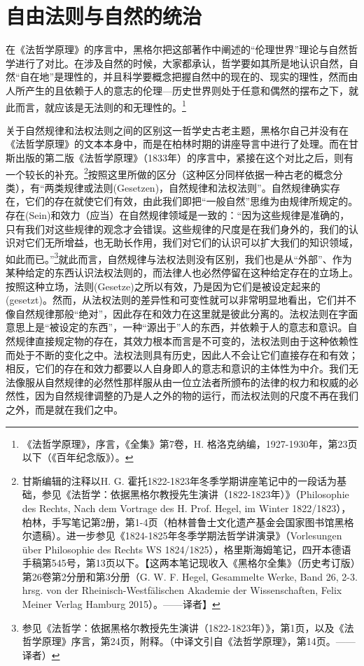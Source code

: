 \chapter{自由法则与自然的统治}

在《法哲学原理》的序言中，黑格尔把这部著作中阐述的“伦理世界”理论与自然哲学进行了对比。在涉及自然的时候，大家都承认，哲学要如其所是地认识自然，自然“自在地”是理性的，并且科学要概念把握自然中的现在的、现实的理性，然而由人所产生的且依赖于人的意志的伦理—历史世界则处于任意和偶然的摆布之下，就此而言，就应该是无法则的和无理性的。\footnote{《法哲学原理》，序言，《全集》第7卷，H. 格洛克纳编，1927-1930年，第23页以下（《百年纪念版》）。}

关于自然规律和法权法则之间的区别这一哲学史古老主题，黑格尔自己并没有在《法哲学原理》的文本本身中，而是在柏林时期的讲座导言中进行了处理。而在甘斯出版的第二版《法哲学原理》（1833年）的序言中，紧接在这个对比之后，则有一个较长的补充。\footnote{甘斯编辑的注释以H. G. 霍托1822-1823年冬季学期讲座笔记中的一段话为基础，参见《法哲学：依据黑格尔教授先生演讲（1822-1823年）》（Philosophie des Rechts, Nach dem Vortrage des H. Prof. Hegel, im Winter 1822/1823），柏林，手写笔记第2册，第1-4页（柏林普鲁士文化遗产基金会国家图书馆黑格尔遗稿）。进一步参见《1824-1825年冬季学期法哲学讲演录》（Vorlesungen über Philosophie des Rechts WS 1824/1825），格里斯海姆笔记，四开本德语手稿第545号，第13页以下。【这两本笔记现收入《黑格尔全集》（历史考订版）第26卷第2分册和第3分册（G. W. F. Hegel, Gesammelte Werke, Band 26, 2-3. hrsg. von der Rheinisch-Westfälischen Akademie der Wissenschaften, Felix Meiner Verlag Hamburg 2015）。——译者】}按照这里所做的区分（这种区分同样依据一种古老的概念分类），有“两类规律或法则(Gesetzen)，自然规律和法权法则”。自然规律确实存在，它们的存在就使它们有效，由此我们即把“一般自然”思维为由规律所规定的。存在(Sein)和效力（应当）在自然规律领域是一致的：“因为这些规律是准确的，只有我们对这些规律的观念才会错误。这些规律的尺度是在我们身外的，我们的认识对它们无所增益，也无助长作用，我们对它们的认识可以扩大我们的知识领域，如此而已。”\footnote{参见《法哲学：依据黑格尔教授先生演讲（1822-1823年）》，第1页，以及《法哲学原理》序言，第24页，附释。（中译文引自《法哲学原理》，第14页。——译者）}就此而言，自然规律与法权法则没有区别，我们也是从“外部”、作为某种给定的东西认识法权法则的，而法律人也必然停留在这种给定存在的立场上。按照这种立场，法则(Gesetze)之所以有效，乃是因为它们是被设定起来的(gesetzt)。然而，从法权法则的差异性和可变性就可以非常明显地看出，它们并不像自然规律那般“绝对”，因此存在和效力在这里就是彼此分离的。法权法则在字面意思上是“被设定的东西”，一种“源出于”人的东西，并依赖于人的意志和意识。自然规律直接规定物的存在，其效力根本而言是不可变的，法权法则由于这种依赖性而处于不断的变化之中。法权法则具有历史，因此人不会让它们直接存在和有效；相反，它们的存在和效力都要以人自身即人的意志和意识的主体性为中介。我们无法像服从自然规律的必然性那样服从由一位立法者所颁布的法律的权力和权威的必然性，因为自然规律调整的乃是人之外的物的运行，而法权法则的尺度不再在我们之外，而是就在我们之中。

